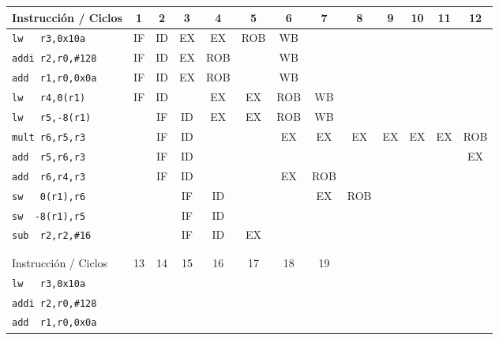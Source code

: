 \begin{ejercicio}
    \begin{table}
        \centering
        \scriptsize
        \begin{tabular}{|l|c|c|c|c|c|c|c|c|c|c|c|c|}
            \hline
            Instrucción / Ciclos & 1 & 2 & 3 & 4 & 5 & 6 & 7 & 8 & 9 & 10 & 11 & 12 \\
            \hline
            \verb|lw   r3,0x10a|        & IF & ID & EX & EX & ROB & WB & & & & & &\\
            \hline        
            \verb|addi r2,r0,#128|      & IF & ID & EX & ROB & & WB & & & & & &\\
            \hline           
            \verb|add  r1,r0,0x0a|      & IF & ID & EX & ROB & &  WB & & & & & & \\
            \hline                        
            \verb|lw   r4,0(r1)|        & IF & ID & & EX & EX & ROB & WB & & & & & \\
            \hline            
            \verb|lw   r5,-8(r1)|       & & IF & ID & EX & EX & ROB & WB & & & && \\
            \hline
            \verb|mult r6,r5,r3|        & & IF & ID & & & EX & EX & EX & EX & EX & EX & ROB\\
            \hline
            \verb|add  r5,r6,r3|        & & IF & ID & & & & & & & & & EX\\
            \hline
            \verb|add  r6,r4,r3|        & & IF & ID & & & EX & ROB & & & & &\\
            \hline            
            \verb|sw   0(r1),r6|        & & & IF & ID & & & EX & ROB & & & & \\
            \hline
            \verb|sw  -8(r1),r5|        & & & IF & ID & & & & & & & &\\
            \hline
            \verb|sub  r2,r2,#16|       & & & IF & ID & EX & & & & & & & \\
            \hline \\ \hline \\ \hline
            \hline
            Instrucción / Ciclos & 13 & 14 & 15 & 16 & 17 & 18 & 19 \\
            \hline
            \verb|lw   r3,0x10a|        & & & & & & &\\
            \hline        
            \verb|addi r2,r0,#128|      & & & & & & &\\
            \hline           
            \verb|add  r1,r0,0x0a|      & & & & & & &\\
            \hline                        

\end{tabular}
\end{table}
\end{ejercicio}
